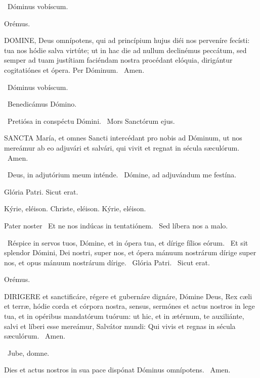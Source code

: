 \sectionornament

\V\ Dóminus vobíscum.

Orémus. 

\lettrine[lines=2]{D}{OMINE}, Deus omnípotens, qui ad princípium hujus diéi nos perveníre fecísti: tua nos hódie salva virtúte; ut in hac die ad nullum declinémus peccátum, sed semper ad tuam justítiam faciéndam nostra procédant elóquia, dirigántur cogitatiónes et ópera. Per Dóminum. \R\ Amen.

\V\ Dóminus vobíscum.

\V\ Benedicámus Dómino.


\V\ Pretiósa in conspéctu Dómini. \R\ Mors Sanctórum ejus.



\lettrine[lines=2]{S}{ANCTA} María, et omnes Sancti intercédant pro nobis ad Dóminum, ut nos mereámur ab eo adjuvári et salvári, qui vivit et regnat in sécula sæculórum. \R\ Amen.

\V\ Deus, in adjutórium meum inténde. \R\ Dómine, ad adjuvándum me festína.

 Glória Patri. Sicut erat.

Kýrie, eléison. Christe, eléison. Kýrie, eléison.

Pater noster  \V\ Et ne nos indúcas in tentatiónem. \R\ Sed líbera nos a malo.

\V\ Réspice in servos tuos, Dómine, et in ópera tua, et dírige fílios eórum. \R\ Et sit splendor Dómini, Dei nostri, super nos, et ópera mánuum nostrárum dírige super nos, et opus mánuum nostrárum dírige. \V\ Glória Patri. \R\ Sicut erat.

Orémus. 

\lettrine[lines=2]{D}{IRIGERE} et sanctificáre, régere et gubernáre dignáre, Dómine Deus, Rex cæli et terræ, hódie corda et córpora nostra, sensus, sermónes et actus nostros in lege tua, et in opéribus mandatórum tuórum: ut hic, et in ætérnum, te auxiliánte, salvi et líberi esse mereámur, Salvátor mundi: Qui vivis et regnas in sécula sæculórum. \R\ Amen.

\V\ Jube, domne.

 Dies et actus nostros in sua pace dispónat Dóminus omnípotens. \R\ Amen.


